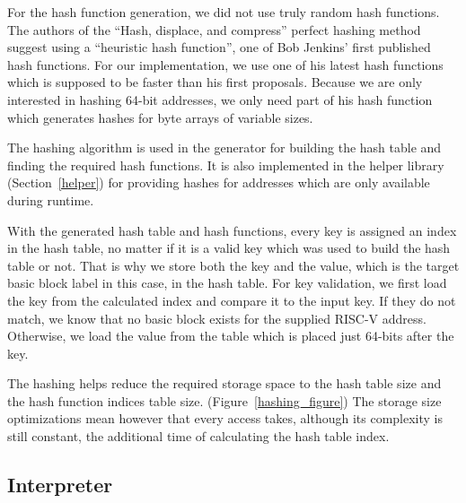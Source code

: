 \documentclass[course=eragp]{aspdoc}
\begin{document}
\begin{enumerate}
          For the hash function generation, we did not use truly random hash functions. The authors of the ``Hash,
          displace, and compress'' perfect hashing method suggest using a ``heuristic hash
          function''\cite{CHD}, one of Bob Jenkins' first published hash functions.\cite{jenkins_hash_1} For
          our implementation, we use one of his latest hash functions which is supposed to be faster than his
          first proposals.\cite{jenkins_hash_2} Because we are only interested in hashing 64-bit addresses, we
          only need part of his hash function which generates hashes for byte arrays of variable sizes.

          \par

          The hashing algorithm is used in the generator for building the hash table and finding the required
          hash functions. It is also implemented in the helper library (Section~\ref{helper}) for providing hashes for addresses
          which are only available during runtime.

          \par

          With the generated hash table and hash functions, every key is assigned an index in the hash table,
          no matter if it is a valid key which was used to build the hash table or not. That is why we store
          both the key and the value, which is the target basic block label in this case, in the hash table.
          For key validation, we first load the key from the calculated index and compare it to the input key.
          If they do not match, we know that no basic block exists for the supplied RISC-V address. Otherwise,
          we load the value from the table which is placed just 64-bits after the key.

          \par

          The hashing helps reduce the required storage space to the hash table size and the hash function
          indices table size. (Figure~\ref{hashing_figure}) The storage size optimizations mean however that
          every access takes, although its complexity is still constant, the additional time of calculating
          the hash table index.
\end{enumerate}

\subsection{Interpreter}\label{interpreter}
\end{document}
